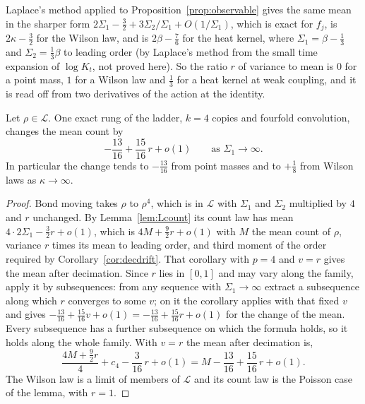 Laplace's method applied to Proposition~\ref{prop:observable} gives the same mean in the sharper form $2\Sigma_1-\frac32+3\Sigma_2/\Sigma_1+O(1/\Sigma_1)$, which is exact for $f_j$, is $2\kappa-\frac32$ for the Wilson law, and is $2\beta-\frac76$ for the heat kernel, where $\Sigma_1=\beta-\frac13$ and $\Sigma_2=\frac13\beta$ to leading order (by Laplace's method from the small time expansion of $\log K_t$, not proved here). So the ratio $r$ of variance to mean is $0$ for a point mass, $1$ for a Wilson law and $\frac13$ for a heat kernel at weak coupling, and it is read off from two derivatives of the action at the identity.

\begin{theorem}\label{thm:firstrung}
Let $\rho\in\mathcal L$. One exact rung of the ladder, $k=4$ copies and fourfold convolution, changes the mean count by
\[
-\frac{13}{16}+\frac{15}{16}\,r+o(1)\qquad\text{as }\Sigma_1\to\infty .
\]
In particular the change tends to $-\frac{13}{16}$ from point masses and to $+\frac18$ from Wilson laws as $\kappa\to\infty$.
\end{theorem}

\begin{proof}
Bond moving takes $\rho$ to $\rho^4$, which is in $\mathcal L$ with $\Sigma_1$ and $\Sigma_2$ multiplied by $4$ and $r$ unchanged. By Lemma~\ref{lem:Lcount} its count law has mean $4\cdot2\Sigma_1-\frac32r+o(1)$, which is $4M+\frac92r+o(1)$ with $M$ the mean count of $\rho$, variance $r$ times its mean to leading order, and third moment of the order required by Corollary~\ref{cor:decdrift}. That corollary with $p=4$ and $v=r$ gives the mean after decimation. Since $r$ lies in $[0,1]$ and may vary along the family, apply it by subsequences: from any sequence with $\Sigma_1\to\infty$ extract a subsequence along which $r$ converges to some $v$; on it the corollary applies with that fixed $v$ and gives $-\frac{13}{16}+\frac{15}{16}v+o(1)=-\frac{13}{16}+\frac{15}{16}r+o(1)$ for the change of the mean. Every subsequence has a further subsequence on which the formula holds, so it holds along the whole family. With $v=r$ the mean after decimation is,
\[
\frac{4M+\frac92r}{4}+c_4-\frac{3}{16}\,r+o(1)=M-\frac{13}{16}+\frac{15}{16}\,r+o(1).
\]
The Wilson law is a limit of members of $\mathcal L$ and its count law is the Poisson case of the lemma, with $r=1$.
\end{proof}

